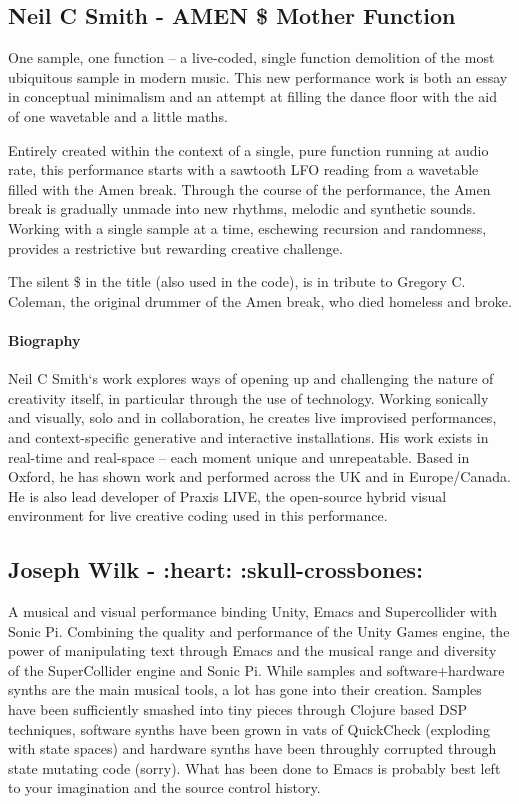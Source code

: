 \documentclass[sigplan,10pt,review]{acmart}\settopmatter{printfolios=true}
\begin{document}
\subsection{Neil C Smith - AMEN \${} Mother Function}

One sample, one function – a live-coded, single function demolition of
the most ubiquitous sample in modern music. This new performance work
is both an essay in conceptual minimalism and an attempt at filling
the dance floor with the aid of one wavetable and a little maths.

Entirely created within the context of a single, pure function running
at audio rate, this performance starts with a sawtooth LFO reading
from a wavetable filled with the Amen break. Through the course of the
performance, the Amen break is gradually unmade into new rhythms,
melodic and synthetic sounds. Working with a single sample at a time,
eschewing recursion and randomness, provides a restrictive but
rewarding creative challenge.

The silent \${} in the title (also used in the code), is in tribute to
Gregory C. Coleman, the original drummer of the Amen break, who died
homeless and broke.

\paragraph{Biography}

Neil C Smith‘s work explores ways of opening up and challenging the
nature of creativity itself, in particular through the use of
technology. Working sonically and visually, solo and in collaboration,
he creates live improvised performances, and context-specific
generative and interactive installations. His work exists in real-time
and real-space – each moment unique and unrepeatable. Based in Oxford,
he has shown work and performed across the UK and in Europe/Canada. He
is also lead developer of Praxis LIVE, the open-source hybrid visual
environment for live creative coding used in this
performance.


\subsection{Joseph Wilk - :heart: :skull-crossbones:}

A musical and visual performance binding Unity, Emacs and
Supercollider with Sonic Pi. Combining the quality and performance of
the Unity Games engine, the power of manipulating text through Emacs
and the musical range and diversity of the SuperCollider engine and
Sonic Pi. While samples and software+hardware synths are the main
musical tools, a lot has gone into their creation. Samples have been
sufficiently smashed into tiny pieces through Clojure based DSP
techniques, software synths have been grown in vats of QuickCheck
(exploding with state spaces) and hardware synths have been throughly
corrupted through state mutating code (sorry). What has been done to
Emacs is probably best left to your imagination and the source control
history.
\end{document}
